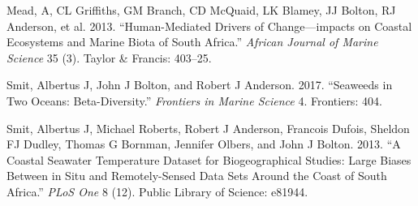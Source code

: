\documentclass[10pt,A4,]{article}
\begin{document}
\hypertarget{refs}{}
\hypertarget{ref-Mead2013}{}
Mead, A, CL Griffiths, GM Branch, CD McQuaid, LK Blamey, JJ Bolton, RJ
Anderson, et al. 2013. ``Human-Mediated Drivers of Change---impacts on
Coastal Ecosystems and Marine Biota of South Africa.'' \emph{African
Journal of Marine Science} 35 (3). Taylor \& Francis: 403--25.

\hypertarget{ref-Smit2017}{}
Smit, Albertus J, John J Bolton, and Robert J Anderson. 2017. ``Seaweeds
in Two Oceans: Beta-Diversity.'' \emph{Frontiers in Marine Science} 4.
Frontiers: 404.

\hypertarget{ref-Smit2013}{}
Smit, Albertus J, Michael Roberts, Robert J Anderson, Francois Dufois,
Sheldon FJ Dudley, Thomas G Bornman, Jennifer Olbers, and John J Bolton.
2013. ``A Coastal Seawater Temperature Dataset for Biogeographical
Studies: Large Biases Between in Situ and Remotely-Sensed Data Sets
Around the Coast of South Africa.'' \emph{PLoS One} 8 (12). Public
Library of Science: e81944.
\end{document}
